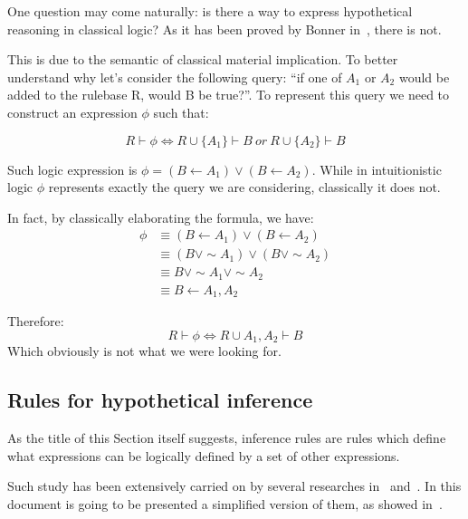 One question may come naturally: is there
a way to express hypothetical reasoning in classical logic?
As it has been proved by Bonner in~\cite{Bonner88alogic}, there is not.

This is due to the semantic of classical material implication. To better understand why
let's consider the following query:
``if one of $A_1$ or $A_2$ would be added
to the rulebase R, would B be true?''. To represent this query we need to construct
an expression $\phi$ such that:

\begin{equation}
  R \vdash \phi \iff R \cup \{A_1\} \vdash B\ or\ R \cup \{A_2\} \vdash B
\end{equation}

Such logic expression is $\phi = (B \leftarrow A_1) \lor (B \leftarrow A_2)$.
While in intuitionistic logic $\phi$ represents exactly the query
we are considering, classically it does not.

In fact, by classically elaborating the formula, we have:
\begin{equation}
  \begin{split}
  \phi &\equiv (B \leftarrow A_1) \lor (B \leftarrow A_2)\\
  &\equiv (B \lor \sim A_1) \lor (B \lor \sim A_2)\\
  &\equiv B \lor \sim A_1 \lor \sim A_2 \\
  &\equiv B \leftarrow A_1, A_2
  \end{split}
\end{equation}

Therefore:
\begin{equation}
  R \vdash \phi \iff R \cup {A_1, A_2} \vdash B
\end{equation}
Which obviously is not what we were looking for.

\subsection{Rules for hypothetical inference}
\label{sec:rfhi}
As the title of this Section itself suggests, inference rules are rules
which define what expressions can be logically defined by a set of other expressions.

Such study has been extensively carried on by several researches
in~\cite{Gabbay1984319}\cite{Miller:1989:LAM:65822.65826} and~\cite{McCarty:1988:CIL:49484.49485}.
In this document is going to be presented a simplified
version of them, as showed in~\cite{Bonner88alogic}.


